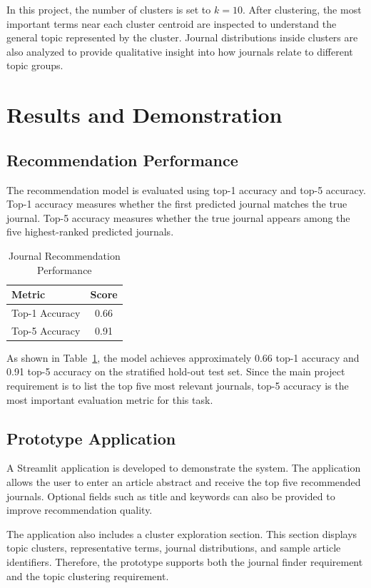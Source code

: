 \documentclass[conference]{IEEEtran}
\begin{document}
In this project, the number of clusters is set to $k=10$. After clustering, the most important terms near each cluster centroid are inspected to understand the general topic represented by the cluster. Journal distributions inside clusters are also analyzed to provide qualitative insight into how journals relate to different topic groups.

\section{Results and Demonstration}

\subsection{Recommendation Performance}
The recommendation model is evaluated using top-1 accuracy and top-5 accuracy. Top-1 accuracy measures whether the first predicted journal matches the true journal. Top-5 accuracy measures whether the true journal appears among the five highest-ranked predicted journals.

\begin{table}[htbp]
\centering
\caption{Journal Recommendation Performance}
\label{tab:performance}
\begin{tabular}{lc}
\toprule
Metric & Score \\
\midrule
Top-1 Accuracy & 0.66 \\
Top-5 Accuracy & 0.91 \\
\bottomrule
\end{tabular}
\end{table}

As shown in Table~\ref{tab:performance}, the model achieves approximately 0.66 top-1 accuracy and 0.91 top-5 accuracy on the stratified hold-out test set. Since the main project requirement is to list the top five most relevant journals, top-5 accuracy is the most important evaluation metric for this task.

\subsection{Prototype Application}
A Streamlit application is developed to demonstrate the system. The application allows the user to enter an article abstract and receive the top five recommended journals. Optional fields such as title and keywords can also be provided to improve recommendation quality.

The application also includes a cluster exploration section. This section displays topic clusters, representative terms, journal distributions, and sample article identifiers. Therefore, the prototype supports both the journal finder requirement and the topic clustering requirement.
\end{document}
